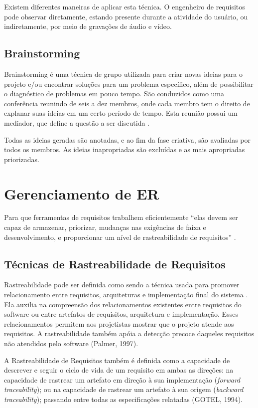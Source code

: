 Existem diferentes maneiras de aplicar esta técnica. O engenheiro de requisitos pode observar diretamente, estando presente
 durante a atividade do usuário, ou indiretamente, por meio de gravações de áudio e vídeo.

 \section{Brainstorming}
 Brainstorming é uma técnica de grupo utilizada para criar novas ideias para o projeto e/ou encontrar soluções para um problema
  específico, além de possibilitar o diagnóstico de problemas em pouco tempo. São conduzidos como uma conferência reunindo de
	seis a dez membros, onde cada membro tem o direito de explanar suas ideias em um certo período de tempo. Esta reunião possui
	 um mediador, que define a questão a ser discutida \cite{gunda2008}.

 Todas as ideias geradas são anotadas, e ao fim da fase criativa, são avaliadas por todos os membros. As ideias inapropriadas
  são excluídas e as mais apropriadas priorizadas.

\chapter{Gerenciamento de ER}
Para que ferramentas de requisitos trabalhem eficientemente “elas devem ser capaz de armazenar, priorizar, mudanças nas exigências de faixa
 e desenvolvimento, e proporcionar um nível de rastreabilidade de requisitos” \cite{delucia2010}.

\section{Técnicas de Rastreabilidade de Requisitos}
Rastreabilidade pode ser definida como sendo a técnica usada para promover relacionamento entre requisitos, arquiteturas e
implementação final do sistema \cite{edwards1991}. Ela auxilia na compreensão dos relacionamentos existentes entre requisitos
 do software ou entre artefatos de requisitos, arquitetura e implementação. Esses relacionamentos permitem aos projetistas
  mostrar que o projeto atende aos requisitos. A rastreabilidade também apóia a detecção precoce daqueles requisitos não
	atendidos pelo software (Palmer, 1997).

A Rastreabilidade de Requisitos também é definida como a capacidade de descrever e seguir o ciclo de vida de um requisito
em ambas as direções: na capacidade de rastrear um artefato em direção à sua implementação (\textit{forward traceability}); ou na
capacidade de rastrear um artefato à sua origem (\textit{backward traceability}); passando entre todas as especificações relatadas
(GOTEL, 1994).

